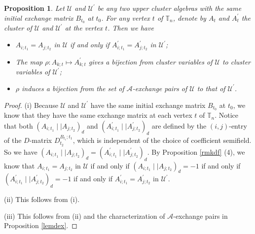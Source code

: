 \documentclass{amsart}
\newtheorem{proposition}[theorem]{Proposition}
\theoremstyle{definition}
\theoremstyle{remark}
\numberwithin{equation}{section}
\begin{document}
\begin{proposition}\label{proexb}
Let  $\mathcal U$ and  $\mathcal U^\prime$ be any two upper cluster algebras with the same initial exchange matrix $B_{t_0}$ at $t_0$.  For any vertex $t$ of $\mathbb T_n$, denote by $A_{t}$ and $A_{t}^\prime$  the  cluster  of $\mathcal U$ and  $\mathcal U^\prime$ at the vertex $t$. Then we have
\begin{itemize}
\item[(i)] $A_{i;t_1}=A_{j;t_2}$ in $\mathcal U$ if and only if $A_{i;t_1}^\prime=A_{j;t_2}^\prime$ in $\mathcal U^\prime$;

\item[(ii)] The map $\rho: A_{k;t}\mapsto A_{k;t}^{\prime}$ gives a bijection from  cluster variables of $\mathcal U$ to cluster variables of $\mathcal U^\prime$;

\item[(iii)] $\rho$ induces a bijection from the  set of  $\mathscr A$-exchange pairs of $\mathcal U$ to that of $\mathcal U^\prime$.
\end{itemize}
\end{proposition}
\begin{proof}
(i) Because $\mathcal U$ and $\mathcal U^\prime$ have the same initial exchange matrix $B_{t_0}$ at $t_0$, we know that they have the same exchange matrix at each vertex $t$ of $\mathbb T_n$.
 Notice that both $(A_{i;t_1}\mid\mid  A_{j;t_2})_d$ and $(A_{i;t_1}^\prime\mid\mid  A_{j;t_2}^\prime)_d$ are defined by the $(i,j)$-entry of the $D$-matrix $D_{t_2}^{B_{t_1}; t_1}$, which is independent of the choice of coefficient semifield. So
  we have $(A_{i;t_1}\mid\mid  A_{j;t_2})_d=(A_{i;t_1}^\prime\mid\mid  A_{j;t_2}^\prime)_d$.  By Proposition \ref{rmkdf} (4), we know that $A_{i;t_1}=A_{j;t_2}$ in $\mathcal U$  if and only if $(A_{i;t_1}\mid\mid  A_{j;t_2})_d=-1$ if and only if $(A_{i;t_1}^\prime\mid\mid  A_{j;t_2}^\prime)_d=-1$ if and only if $A_{i;t_1}^\prime=A_{j;t_2}^\prime$ in $\mathcal U^\prime$.

(ii) This follows from (i).

 (iii) This follows from (ii) and the characterization of  $\mathscr A$-exchange pairs in Proposition \ref{lemdex}.
\end{proof}
\end{document}
